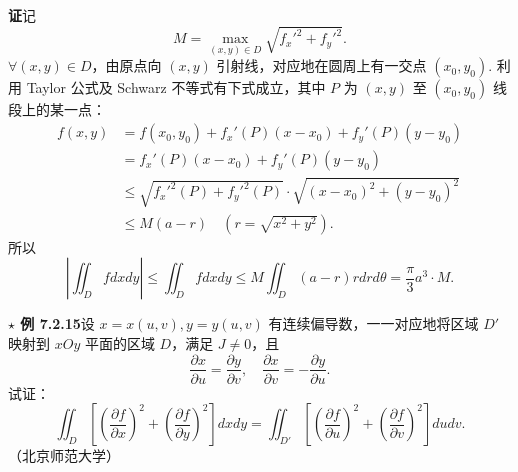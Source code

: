 \documentclass[UTF8, 12pt, fontset=fandol, oneside]{ctexart}
\begin{document}
\noindent\textbf{证}\quad 记
\[
M=\max_{(x,y)\in D}\sqrt{f_x'^2+f_y'^2}.
\]
$\forall(x,y)\in D$，由原点向 $(x,y)$ 引射线，对应地在圆周上有一交点 $(x_0,y_0)$. 利用 Taylor 公式及 Schwarz 不等式有下式成立，其中 $P$ 为 $(x,y)$ 至 $(x_0,y_0)$ 线段上的某一点：
\[
\begin{aligned}
f(x,y)&=f(x_0,y_0)+f_x'(P)(x-x_0)+f_y'(P)(y-y_0)\\
&=f_x'(P)(x-x_0)+f_y'(P)(y-y_0)\\
&\le\sqrt{f_x'^2(P)+f_y'^2(P)}\cdot
\sqrt{(x-x_0)^2+(y-y_0)^2}\\
&\le M(a-r)\quad(r=\sqrt{x^2+y^2}).
\end{aligned}
\]
所以
\[
\left|\iint_D fdxdy\right|\le\iint_Dfdxdy
\le M\iint_D(a-r)rdrd\theta=\frac\pi3a^3\cdot M.
\]

\noindent\textbf{$\star$ 例 7.2.15}\quad 设 $x=x(u,v),y=y(u,v)$ 有连续偏导数，一一对应地将区域 $D'$ 映射到 $xOy$ 平面的区域 $D$，满足 $J\ne0$，且
\[
\frac{\partial x}{\partial u}=\frac{\partial y}{\partial v},\quad
\frac{\partial x}{\partial v}=-\frac{\partial y}{\partial u}. \tag{1}
\]
试证：
\[
\iint_D\left[\left(\frac{\partial f}{\partial x}\right)^2+
\left(\frac{\partial f}{\partial y}\right)^2\right]dxdy
=\iint_{D'}\left[\left(\frac{\partial f}{\partial u}\right)^2+
\left(\frac{\partial f}{\partial v}\right)^2\right]dudv. \tag{2}
\]
（北京师范大学）
\end{document}
